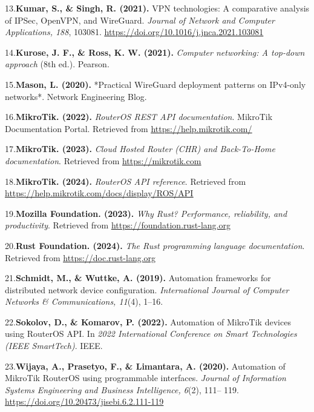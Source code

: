 \documentclass[12pt,a4paper,oneside]{report}
\begin{document}
13.\textbf{Kumar, S., \& Singh, R. (2021). }VPN technologies: A comparative analysis of IPSec, OpenVPN, and WireGuard. \textit{Journal of Network and Computer Applications, 188}, 103081. \href{https://doi.org/10.1016/j.jnca.2021.103081}{\uline{https://doi.org/10.1016/j.jnca.2021.103081}}


14.\textbf{Kurose, J. F., \& Ross, K. W. (2021). }\textit{Computer networking: A top-down approach }(8th ed.). Pearson.


15.\textbf{Mason, L. (2020). }*Practical WireGuard deployment patterns on IPv4-only networks*. Network Engineering Blog.


16.\textbf{MikroTik. (2022). }\textit{RouterOS REST API documentation}. MikroTik Documentation Portal. Retrieved from \href{https://help.mikrotik.com/}{\uline{https://help.mikrotik.com/}}


17.\textbf{MikroTik. (2023). }\textit{Cloud Hosted Router (CHR) and Back-To-Home documentation}. Retrieved from \href{https://mikrotik.com/}{\uline{https://mikrotik.com}}


18.\textbf{MikroTik. (2024). }\textit{RouterOS API reference}. Retrieved from \href{https://help.mikrotik.com/docs/display/ROS/API}{\uline{https://help.mikrotik.com/docs/display/ROS/API}}


19.\textbf{Mozilla Foundation. (2023). }\textit{Why Rust? Performance, reliability, and productivity}. Retrieved from \href{https://foundation.rust-lang.org/}{\uline{https://foundation.rust-lang.org}}












20.\textbf{Rust Foundation. (2024). }\textit{The Rust programming language documentation}. Retrieved from \href{https://doc.rust-lang.org/}{\uline{https://doc.rust-lang.org}}


21.\textbf{Schmidt, M., \& Wuttke, A. (2019). }Automation frameworks for distributed network device configuration. \textit{International Journal of Computer Networks \& Communications, 11}(4), 1--16.


22.\textbf{Sokolov, D., \& Komarov, P. (2022). }Automation of MikroTik devices using RouterOS API. In \textit{2022 International Conference on Smart Technologies (IEEE SmartTech)}. IEEE.


23.\textbf{Wijaya, A., Prasetyo, F., \& Limantara, A. (2020). }Automation of MikroTik RouterOS using programmable interfaces. \textit{Journal of Information Systems Engineering and Business Intelligence, 6}(2), 111-- 119. \href{https://doi.org/10.20473/jisebi.6.2.111-119}{https://doi.org/10.20473/jisebi.6.2.111-119}
\end{document}
